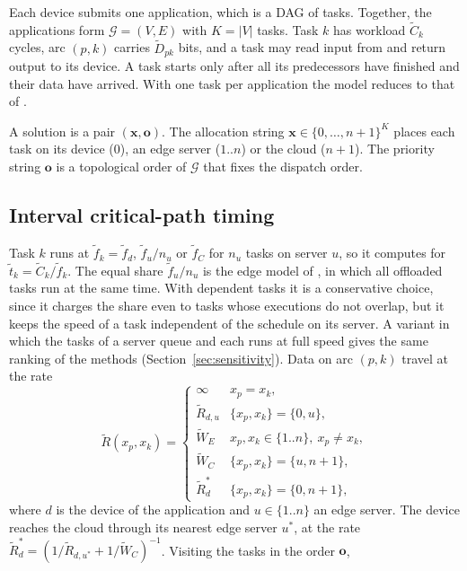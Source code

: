 Each device submits one application, which is a DAG of tasks. Together, the applications form $\mathcal{G} = (V, E)$
with $K = |V|$ tasks. Task $k$
has workload $\tilde C_k$ cycles, arc $(p, k)$ carries $\tilde D_{pk}$ bits, and a task may read input from and return
output to its device. A task starts only after all its predecessors have finished and their data have arrived. With one
task per application the model reduces to that of \citet{jin2026imoeadqn}.

A solution is a pair $(\mathbf{x}, \mathbf{o})$. The allocation string $\mathbf{x} \in \{0, \dots, n+1\}^K$ places each
task on its device ($0$), an edge server ($1..n$) or the cloud ($n+1$). The priority string $\mathbf{o}$ is a
topological order of $\mathcal{G}$ that fixes the dispatch order.

\subsection{Interval critical-path timing}
Task $k$ runs at $\tilde f_k = \tilde f_d$, $\tilde f_u / n_u$ or $\tilde f_C$ for $n_u$ tasks on server $u$, so it
computes for $\tilde t_k = \tilde C_k / \tilde f_k$. The equal share $\tilde f_u / n_u$ is the edge model of
\citet{jin2026imoeadqn}, in which all offloaded tasks run at the same time. With dependent tasks it is a conservative
choice, since it charges the share even to tasks whose executions do not overlap, but it keeps the speed of a task
independent of the schedule on its server. A variant in which the tasks of a server queue and each runs at full speed
gives the same ranking of the methods (Section~\ref{sec:sensitivity}). Data on arc $(p, k)$ travel at the rate
\begin{equation}
\tilde R(x_p, x_k) = \begin{cases}
\infty & x_p = x_k,\\
\tilde R_{d,u} & \{x_p, x_k\} = \{0, u\},\\
\tilde W_E & x_p, x_k \in \{1..n\},\ x_p \ne x_k,\\
\tilde W_C & \{x_p, x_k\} = \{u, n+1\},\\
\tilde R^*_d & \{x_p, x_k\} = \{0, n+1\},
\end{cases}
\label{eq:rate}
\end{equation}
where $d$ is the device of the application and $u \in \{1..n\}$ an edge server. The device reaches the cloud through
its nearest edge server $u^*$, at the rate $\tilde R^*_d = (1 / \tilde R_{d,u^*} + 1 / \tilde W_C)^{-1}$. Visiting the tasks in the order $\mathbf{o}$,
